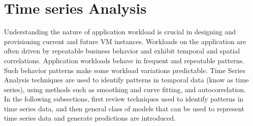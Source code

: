 \section{Time series Analysis}
\label{sec:Timeseries}
Understanding the nature of application workload is crucial in designing and provisioning current and future VM instances. Workloads on the application are often driven by repeatable business behavior and exhibit temporal and spatial correlations. Application workloads behave in frequent and repeatable patterns. Such behavior patterns make some workload variations predictable\cite{mao2011auto}. Time Series Analysis techniques are used to identify patterns in temporal data (know as time series), using methods such as smoothing and curve fitting, and autocorrelation\cite{timeseriesdefinition}. In the following subsections, first review techniques used to identify patterns in time series data, and then general class of models that can be used to represent time series data and generate predictions are introduced.
